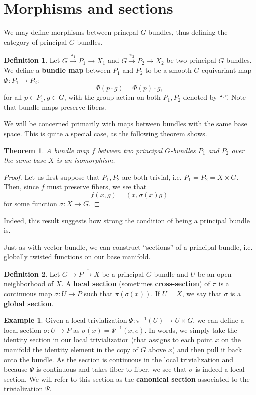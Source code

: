 \documentclass{book}
\theoremstyle{plain}
\newtheorem{thm}{Theorem}
\theoremstyle{definition}
\newtheorem{defn}{Definition}
\newtheorem{exmp}{Example}
\theoremstyle{remark}
\begin{document}
\section{Morphisms and sections}

We may define morphisms between princpal $G$-bundles, thus defining the category of principal $G$-bundles.
\begin{defn}
    Let $G\overset{\pi_1}{\to}P_1\to X_1$ and $G\overset{\pi_2}{\to}P_2\to X_2$ be two principal $G$-bundles. We define a \textbf{bundle
    map} between $P_1$ and $P_2$ to be a smooth $G$-equivariant map $\Phi:P_1\to P_2$:
    \[\Phi(p\cdot g)=\Phi(p)\cdot g,\]
    for all $p\in P_1, g\in G$, with the group action on both $P_1,P_2$ denoted by ``$\cdot$''. Note that bundle maps preserve fibers.
\end{defn}

We will be concerned primarily with maps between bundles with the same base space. This is quite a special case, as the following theorem shows.
\begin{thm}
    A bundle map $f$ between two principal $G$-bundles $P_1$ and $P_2$ over the same base $X$ is an isomorphism.
\end{thm}
\begin{proof}
    Let us first suppose that $P_1,P_2$ are both trivial, i.e. $P_1=P_2=X\times G$. Then, since $f$ must preserve fibers, we see that
    \[f(x,g)=(x,\sigma(x)g)\]
    for some function $\sigma:X\to G$.
\end{proof}
Indeed, this result suggests how strong the condition of being a principal bundle is.



Just as with vector bundle, we can construct ``sections'' of a principal bundle, i.e. globally twisted functions on our base manifold.

\begin{defn}
    Let $G\to P\overset{\pi}{\to} X$ be a principal $G$-bundle and $U$ be an open neighborhood of $X$. A \textbf{local section} (sometimes \textbf{cross-section}) of $\pi$ is a continuous map $\sigma: U\to P$ such that $\pi(\sigma(x))$. If $U=X$, we say that $\sigma$ is a \textbf{global section}.
\end{defn}

\begin{exmp}
    Given a local trivialization $\Psi:\pi^{-1}(U)\to U\times G$, we can define a local section $\sigma:U\to P$ as $\sigma(x)=\Psi^{-1}(x,e)$. In words, we simply take the identity section in our local trivialization (that assigns to each point $x$ on the manifold the identity element in the copy of $G$ above $x$) and then pull it back onto the bundle. As the section is continuous in the local trivialization and because $\Psi$ is continuous and takes fiber to fiber, we see that $\sigma$ is indeed a local section. We will refer to this section as the \textbf{canonical section} associated to the trivialization $\Psi$.
\end{exmp}
\end{document}
